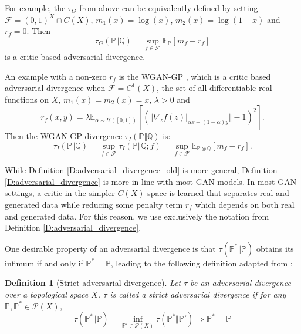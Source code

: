 \documentclass{article}
\newtheorem{definition}{Definition}
\begin{document}
For example, the $\tau_G$ from above can be equivalently defined by setting $\mathcal F=(0,1)^X\cap C(X)$, $m_1(x)=\log(x)$, $m_2(x)=\log(1-x)$ and $r_f=0$. Then
 \begin{equation}\label{E:goodfellow_gan}
 \tau_G(\mathbb P\Vert\mathbb Q)=\sup_{f\in\mathcal F}\mathbb E_{\mathbb P}[m_f-r_f]
 \end{equation}
is a critic based adversarial divergence.

An example with a non-zero $r_f$ is the WGAN-GP \cite{gulrajani2017improved}, which is a critic based adversarial divergence when $\mathcal F=C^1(X)$,
the set of all differentiable real functions on $X$,
$m_1(x)=m_2(x)=x$, $\lambda>0$ and
\[r_f(x,y)=\lambda\mathbb E_{\alpha\sim\mathcal U([0,1])}[(\Vert\nabla_z f(z)|_{\alpha x + (1-\alpha) y}\Vert-1)^2].\]
Then the WGAN-GP divergence $\tau_I(\mathbb P\Vert\mathbb Q)$ is:
\begin{equation}\label{E:WGAN_GP}
 \tau_{I}(\mathbb P\Vert\mathbb Q)=\sup_{f\in\mathcal F}\tau_{I}(\mathbb P\Vert\mathbb Q;f)=\sup_{f\in\mathcal F}\mathbb E_{\mathbb P\otimes\mathbb Q}[m_f - r_f].
\end{equation}

While Definition \ref{D:adversarial_divergence_old} is more general, Definition \ref{D:adversarial_divergence} is more in line with most GAN models.
In most GAN settings, a critic in the simpler $C(X)$ space is learned that separates real and generated data
while reducing some penalty term $r_f$ which depends on both real and generated data. For this reason, we use exclusively the notation from Definition \ref{D:adversarial_divergence}.

One desirable property of an adversarial divergence is that $\tau(\mathbb P^*\Vert\mathbb P)$ obtains its infimum if and only if
$\mathbb P^*=\mathbb P$, leading to the following definition adapted from \cite{liu2017approximation}:

\begin{definition}[Strict adversarial divergence]
 Let $\tau$ be an adversarial divergence over a topological space $X$.
 $\tau$ is called a strict adversarial divergence if for any $\mathbb P,\mathbb P^*\in\mathcal P(X)$,
 \[\tau(\mathbb P^*\Vert\mathbb P)=\inf_{\mathbb P'\in\mathcal P(X)}\tau(\mathbb P^*\Vert\mathbb P')\Rightarrow \mathbb P^*=\mathbb P\]
\end{definition}
\end{document}
